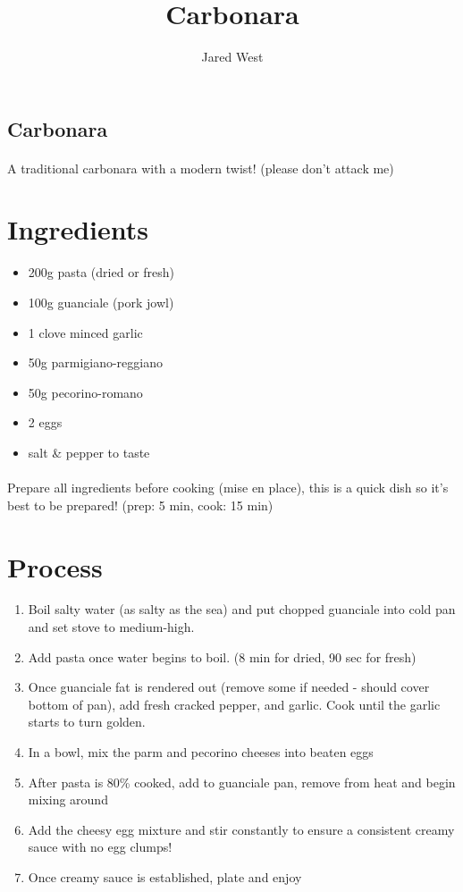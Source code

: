 \documentclass[12pt]{article}
\title{Carbonara}
\author{Jared West}
\begin{document}


\begin{center}
    \section*{\huge{Carbonara}}
    \paragraph{}
    A traditional carbonara with a modern twist! (please don't attack me)
\end{center}

\section*{Ingredients}

\begin{itemize}
    \item 200g pasta (dried or fresh)
    \item 100g guanciale (pork jowl)
    \item 1 clove minced garlic
    \item 50g parmigiano-reggiano
    \item 50g pecorino-romano
    \item 2 eggs
    \item salt \& pepper to taste
\end{itemize}

\paragraph{}
Prepare all ingredients before cooking (mise en place), this is a quick dish so it's best to be prepared! (prep: 5 min, cook: 15 min)
\section*{Process}

\begin{enumerate}
    \item Boil salty water (as salty as the sea) and put chopped guanciale into cold pan and set stove to medium-high.
    \item Add pasta once water begins to boil. (8 min for dried, 90 sec for fresh)
    \item Once guanciale fat is rendered out (remove some if needed - should cover bottom of pan), add fresh cracked pepper, and garlic. Cook until the garlic starts to turn golden.
    \item In a bowl, mix the parm and pecorino cheeses into beaten eggs
    \item After pasta is 80\% cooked, add to guanciale pan, remove from heat and begin mixing around
    \item Add the cheesy egg mixture and stir constantly to ensure a consistent creamy sauce with no egg clumps!
    \item Once creamy sauce is established, plate and enjoy
\end{enumerate}
\end{document}
